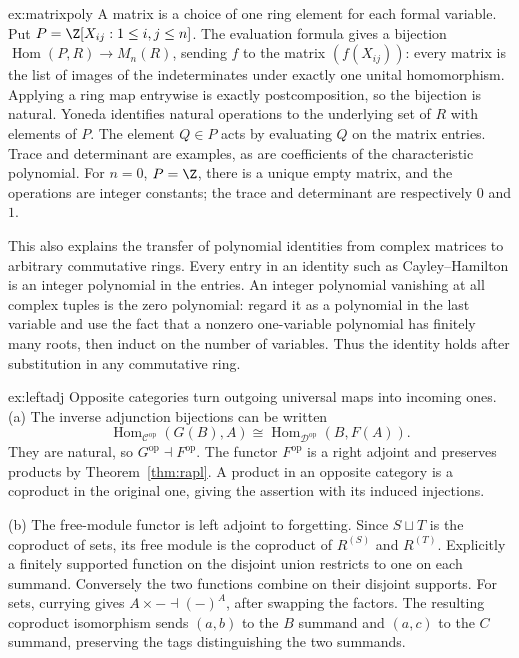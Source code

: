 \begin{solution}{ex:matrixpoly}
\idea A matrix is a choice of one ring element for each formal variable.
\writeup Put $P=\Z[X_{ij}:1\le i,j\le n]$. The evaluation formula gives a bijection $\operatorname{Hom}(P,R)\to M_n(R)$, sending $f$ to the matrix $(f(X_{ij}))$: every matrix is the list of images of the indeterminates under exactly one unital homomorphism. Applying a ring map entrywise is exactly postcomposition, so the bijection is natural. Yoneda identifies natural operations to the underlying set of $R$ with elements of $P$. The element $Q\in P$ acts by evaluating $Q$ on the matrix entries. Trace and determinant are examples, as are coefficients of the characteristic polynomial. For $n=0$, $P=\Z$, there is a unique empty matrix, and the operations are integer constants; the trace and determinant are respectively $0$ and $1$.

This also explains the transfer of polynomial identities from complex matrices to arbitrary commutative rings. Every entry in an identity such as Cayley--Hamilton is an integer polynomial in the entries. An integer polynomial vanishing at all complex tuples is the zero polynomial: regard it as a polynomial in the last variable and use the fact that a nonzero one-variable polynomial has finitely many roots, then induct on the number of variables. Thus the identity holds after substitution in any commutative ring.
\end{solution}

\begin{solution}{ex:leftadj}
\idea Opposite categories turn outgoing universal maps into incoming ones.
\writeup (a) The inverse adjunction bijections can be written
\[
\operatorname{Hom}_{\mathcal C^{\mathrm{op}}}(G(B),A)
 \cong\operatorname{Hom}_{\mathcal D^{\mathrm{op}}}(B,F(A)).
\]
They are natural, so $G^{\mathrm{op}}\dashv F^{\mathrm{op}}$. The functor $F^{\mathrm{op}}$ is a right adjoint and preserves products by Theorem~\ref{thm:rapl}. A product in an opposite category is a coproduct in the original one, giving the assertion with its induced injections.

(b) The free-module functor is left adjoint to forgetting. Since $S\sqcup T$ is the coproduct of sets, its free module is the coproduct of $R^{(S)}$ and $R^{(T)}$. Explicitly a finitely supported function on the disjoint union restricts to one on each summand. Conversely the two functions combine on their disjoint supports. For sets, currying gives $A\times-\dashv(-)^A$, after swapping the factors. The resulting coproduct isomorphism sends $(a,b)$ to the $B$ summand and $(a,c)$ to the $C$ summand, preserving the tags distinguishing the two summands.
\end{solution}


